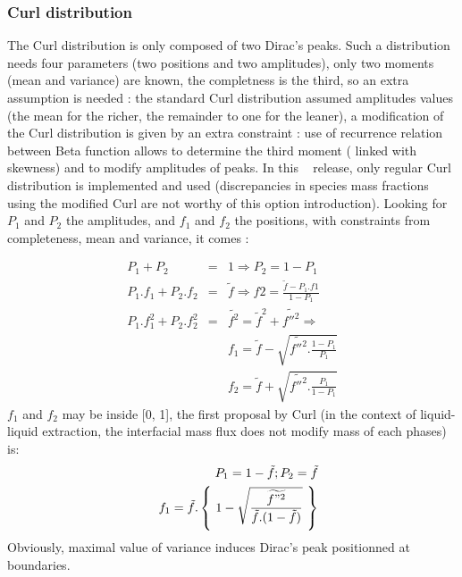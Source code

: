 \subsubsection{Curl distribution}

The Curl distribution is only composed of two Dirac's peaks. Such a distribution
needs four parameters (two positions and two amplitudes), only two moments (mean
and variance) are known, the completness is the third, so an extra assumption is
needed : the standard Curl distribution assumed amplitudes values (the mean for
the richer, the remainder to one for the leaner), a modification of the Curl
distribution is given by an extra constraint : use of recurrence relation
between Beta function allows to determine the third moment ( linked with
skewness) and to modify amplitudes of peaks. In this \CS~ release, only
regular Curl distribution is implemented and used (discrepancies in species mass
fractions using the modified Curl are not worthy of this option introduction).
Looking for $P_1$ and $P_2$ the amplitudes, and $f_1$ and $f_2$ the positions,
with constraints from completeness, mean and variance, it comes :

\begin{eqnarray}
\label{eq:P1P2}
        P_1 + P_2 & = & 1 \Rightarrow P_2 = 1-P_1                                    \label{Eqs_xx1} \\
  P_1.f_1 + P_2.f_2 & = & \tilde{f}  \Rightarrow f2 = \frac{\tilde{f}-P_1.f1}{1-P_1}   \label{Eqs_xx2} \\
P_1.f_1^2+P_2.f_2^2 & = & \widetilde{f^2} = \tilde{f}^2+\widetilde{f{''}^2} \Rightarrow \label{Eqs_xx3} \\
                &   & f_1 = \tilde{f} - \sqrt{\widetilde{f{''}^2} . \frac{1-P_1}{P_1}} \label{Eqs_xx4} \\
                &   & f_2 = \tilde{f} + \sqrt{\widetilde{f{''}^2} . \frac{P_1}{1-P_1}} \label{Eqs_xx5}
\end{eqnarray}
$f_1$ and $f_2$ may be inside [0, 1], the first proposal by Curl (in the context
of liquid-liquid extraction, the interfacial mass flux does not modify mass of
each phases) is:
\begin{eqnarray}
&& P_1 = 1-\tilde{f} ; P_2=\tilde{f}                                                  \nonumber \\
&& f_1 = \tilde{f}.\left\{~ 1-\sqrt{\frac{\widetilde{f"^2}}{\tilde{f}.(1-\tilde{f})}} ~\right\} \label{Eqs_xx6}
\end{eqnarray}
Obviously, maximal value of variance induces Dirac's peak positionned at boundaries.

